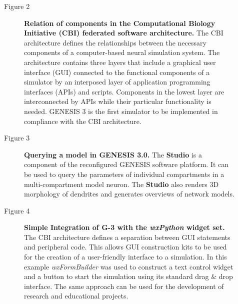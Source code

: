 \documentclass[10pt]{article}
\begin{document}
\clearpage

Figure 2

\begin{figure}[ht]
\begin{center}
\end{center}
\caption{
{\bf Relation of components in the Computational Biology Initiative (CBI) federated software architecture.} The CBI architecture defines the relationships between the necessary components of a computer-based neural simulation system. The architecture contains three layers that include a graphical user interface (GUI) connected to the functional components of a simulator by an interposed layer of application programming interfaces (APIs) and scripts. Components in the lowest layer are interconnected by APIs while their particular functionality is needed. GENESIS 3 is the first simulator to be implemented in compliance with the CBI architecture.
}
\label{fig:cbi-arch}
\end{figure}

\clearpage

Figure 3

\begin{figure}[ht]
\begin{center}
\end{center}
\caption{
{\bf Querying a model in GENESIS 3.0.} The {\bf Studio} is a component of the reconfigured GENESIS software platform. It can be used to query the parameters of individual compartments in a multi-compartment model neuron. The {\bf Studio} also renders 3D morphology of dendrites and generates overviews of network models.
}
\label{fig:cbi-studio}
\end{figure}

\clearpage

Figure 4

\begin{figure}[ht]
\begin{center}
\end{center}
\caption{ {\bf Simple Integration of G-3 with the {\it wxPython}
    widget set.}  The CBI architecture defines a separation between
  GUI statements and peripheral code.  This allows GUI construction
  kits to be used for the creation of a user-friendly interface to a
  simulation.  In this example {\it wxFormBuilder} was used to
  construct a text control widget and a button to start the simulation
  using its standard drag \& drop interface.  The same approach can be
  used for the development of research and educational projects.  }
\label{fig:g3-wx}
\end{figure}
\end{document}
